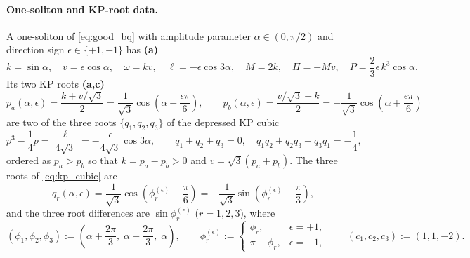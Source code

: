 \documentclass[11pt,a4paper]{article}
\begin{document}
\paragraph{One-soliton and KP-root data.}
A one-soliton of \eqref{eq:good_bq} with amplitude parameter
$\alpha \in (0,\pi/2)$ and direction sign $\epsilon \in \{+1,-1\}$ has \textbf{(a)}
\begin{equation}\label{eq:sol_data}
  k = \sin\alpha, \quad v = \epsilon\cos\alpha, \quad \omega = kv, \quad
  \ell = -\epsilon\cos 3\alpha, \quad M = 2k, \quad \Pi = -Mv, \quad
  P = \frac{2}{3}\epsilon\,k^3\cos\alpha.
\end{equation}
Its two KP roots \textbf{(a,c)}
\begin{equation}\label{eq:kp_roots_sol}
  p_a(\alpha,\epsilon) = \frac{k + v/\sqrt{3}}{2}
  = \frac{1}{\sqrt{3}}\cos\!\left(\alpha - \frac{\epsilon\pi}{6}\right), \qquad
  p_b(\alpha,\epsilon) = \frac{v/\sqrt{3} - k}{2}
  = -\frac{1}{\sqrt{3}}\cos\!\left(\alpha + \frac{\epsilon\pi}{6}\right)
\end{equation}
are two of the three roots $\{q_1,q_2,q_3\}$ of the depressed KP cubic
\begin{equation}\label{eq:kp_cubic}
  p^3 - \frac{1}{4}p = \frac{\ell}{4\sqrt{3}}
  = -\frac{\epsilon}{4\sqrt{3}}\cos 3\alpha, \qquad
  q_1 + q_2 + q_3 = 0, \quad q_1 q_2 + q_2 q_3 + q_3 q_1 = -\frac{1}{4},
\end{equation}
ordered as $p_a > p_b$ so that $k = p_a - p_b > 0$ and $v = \sqrt{3}(p_a + p_b)$.
The three roots of \eqref{eq:kp_cubic} are
\begin{equation}\label{eq:three_roots}
  q_r(\alpha,\epsilon) = \frac{1}{\sqrt{3}}\cos\!\left(\phi_r^{(\epsilon)} + \frac{\pi}{6}\right)
  = -\frac{1}{\sqrt{3}}\sin\!\left(\phi_r^{(\epsilon)} - \frac{\pi}{3}\right),
\end{equation}
and the three root differences are $\sin\phi_r^{(\epsilon)}$ ($r=1,2,3$), where
\begin{equation}\label{eq:phi_r}
  (\phi_1,\phi_2,\phi_3) := \left(\alpha + \frac{2\pi}{3},\; \alpha - \frac{2\pi}{3},\; \alpha\right),
  \qquad
  \phi_r^{(\epsilon)} := \begin{cases}
    \phi_r, & \epsilon = +1,\\
    \pi - \phi_r, & \epsilon = -1,
  \end{cases}
  \qquad (c_1,c_2,c_3) := (1,1,-2).
\end{equation}
\end{document}
